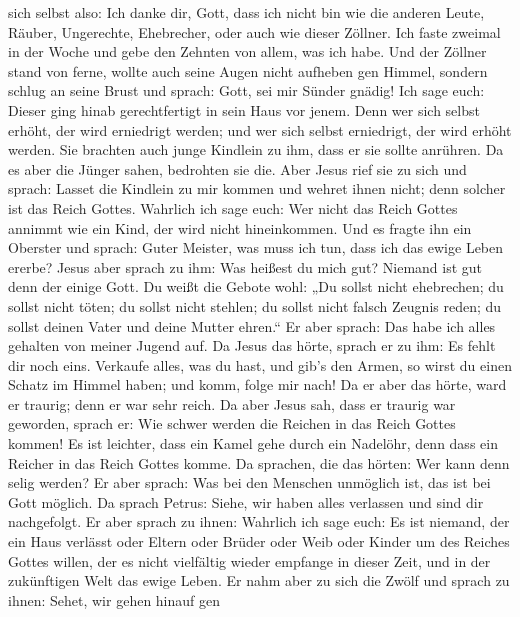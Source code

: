 sich selbst also: Ich danke dir, Gott, dass ich nicht bin wie die
anderen Leute, Räuber, Ungerechte, Ehebrecher, oder auch wie dieser
Zöllner.  Ich faste zweimal in der Woche und gebe den
Zehnten von allem, was ich habe.  Und der Zöllner stand von
ferne, wollte auch seine Augen nicht aufheben gen Himmel, sondern schlug
an seine Brust und sprach: Gott, sei mir Sünder gnädig! 
Ich sage euch: Dieser ging hinab gerechtfertigt in sein Haus vor jenem.
Denn wer sich selbst erhöht, der wird erniedrigt werden; und wer sich
selbst erniedrigt, der wird erhöht werden.  Sie brachten
auch junge Kindlein zu ihm, dass er sie sollte anrühren. Da es aber die
Jünger sahen, bedrohten sie die.  Aber Jesus rief sie zu
sich und sprach: Lasset die Kindlein zu mir kommen und wehret ihnen
nicht; denn solcher ist das Reich Gottes.  Wahrlich ich
sage euch: Wer nicht das Reich Gottes annimmt wie ein Kind, der wird
nicht hineinkommen.  Und es fragte ihn ein Oberster und
sprach: Guter Meister, was muss ich tun, dass ich das ewige Leben
ererbe?  Jesus aber sprach zu ihm: Was heißest du mich gut?
Niemand ist gut denn der einige Gott.  Du weißt die Gebote
wohl: „Du sollst nicht ehebrechen; du sollst nicht töten; du sollst
nicht stehlen; du sollst nicht falsch Zeugnis reden; du sollst deinen
Vater und deine Mutter ehren.``  Er aber sprach: Das habe
ich alles gehalten von meiner Jugend auf.  Da Jesus das
hörte, sprach er zu ihm: Es fehlt dir noch eins. Verkaufe alles, was du
hast, und gib's den Armen, so wirst du einen Schatz im Himmel haben; und
komm, folge mir nach!  Da er aber das hörte, ward er
traurig; denn er war sehr reich.  Da aber Jesus sah, dass
er traurig war geworden, sprach er: Wie schwer werden die Reichen in das
Reich Gottes kommen!  Es ist leichter, dass ein Kamel gehe
durch ein Nadelöhr, denn dass ein Reicher in das Reich Gottes komme.
 Da sprachen, die das hörten: Wer kann denn selig werden?
 Er aber sprach: Was bei den Menschen unmöglich ist, das
ist bei Gott möglich.  Da sprach Petrus: Siehe, wir haben
alles verlassen und sind dir nachgefolgt.  Er aber sprach
zu ihnen: Wahrlich ich sage euch: Es ist niemand, der ein Haus verlässt
oder Eltern oder Brüder oder Weib oder Kinder um des Reiches Gottes
willen,  der es nicht vielfältig wieder empfange in dieser
Zeit, und in der zukünftigen Welt das ewige Leben.  Er nahm
aber zu sich die Zwölf und sprach zu ihnen: Sehet, wir gehen hinauf gen
